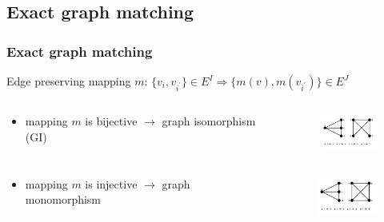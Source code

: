 \documentclass[hyperref={pdfpagelabels=false}]{beamer}
\begin{document}
\subsection{Exact graph matching}
\begin{frame}[allowframebreaks]
\frametitle{Exact graph matching}
Edge preserving mapping $m$:
$\{v_i,v_{i^\prime}\}\in E^I\Rightarrow\{m(v),m(v_{i^\prime})\}\in E^J$ %

\begin{minipage}[0.2\textheight]{\textwidth}
	\begin{columns}[T]
		\begin{column}{0.6\textwidth}
			\begin{itemize}
			\item mapping $m$ is bijective $\rightarrow$ graph isomorphism (GI)
			\end{itemize}
		\end{column}
		\begin{column}{0.3\textwidth}
			\begin{figure}[h!]
			    \centering
			    \includegraphics[width=2cm]{fig/GI}
			\end{figure}
		\end{column}
	\end{columns}
\end{minipage}

\begin{minipage}[0.2\textheight]{\textwidth}
	\begin{columns}[T]
		\begin{column}{0.6\textwidth}
			\begin{itemize}
			\item mapping $m$ is injective $\rightarrow$ graph monomorphism
			\end{itemize}
		\end{column}
		\begin{column}{0.3\textwidth}
			\begin{figure}[h!]
			    \centering
			    \includegraphics[width=2cm]{fig/monomorphism}
			\end{figure}
		\end{column}
	\end{columns}
\end{minipage}


\end{frame}
\end{document}
